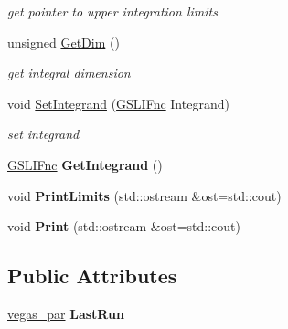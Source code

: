 \begin{DoxyCompactItemize}
\begin{DoxyCompactList}\small\item\em get pointer to upper integration limits \end{DoxyCompactList}\item 
\hypertarget{classIntegral_a6ed296293c2b08c0236481e865f853b7}{}unsigned \hyperlink{classIntegral_a6ed296293c2b08c0236481e865f853b7}{Get\+Dim} ()\label{classIntegral_a6ed296293c2b08c0236481e865f853b7}

\begin{DoxyCompactList}\small\item\em get integral dimension \end{DoxyCompactList}\item 
\hypertarget{classIntegral_ad1732ff730fedb0318db082f664aa195}{}void \hyperlink{classIntegral_ad1732ff730fedb0318db082f664aa195}{Set\+Integrand} (\hyperlink{Integrator_8h_a5a37a44de4bd56d47abffb5be0efb308}{G\+S\+L\+I\+Fnc} Integrand)\label{classIntegral_ad1732ff730fedb0318db082f664aa195}

\begin{DoxyCompactList}\small\item\em set integrand \end{DoxyCompactList}\item 
\hypertarget{classIntegral_a434ffd1525d0110a9e0d472721f51a32}{}\hyperlink{Integrator_8h_a5a37a44de4bd56d47abffb5be0efb308}{G\+S\+L\+I\+Fnc} {\bfseries Get\+Integrand} ()\label{classIntegral_a434ffd1525d0110a9e0d472721f51a32}

\item 
\hypertarget{classIntegral_a318a1ac7c8715d403046764afc47e66c}{}void {\bfseries Print\+Limits} (std\+::ostream \&ost=std\+::cout)\label{classIntegral_a318a1ac7c8715d403046764afc47e66c}

\item 
\hypertarget{classIntegral_ac16a7e08428f7b1879638a9a2981aea6}{}void {\bfseries Print} (std\+::ostream \&ost=std\+::cout)\label{classIntegral_ac16a7e08428f7b1879638a9a2981aea6}

\end{DoxyCompactItemize}
\subsection*{Public Attributes}
\begin{DoxyCompactItemize}
\item 
\hypertarget{classIntegral_a9d7c0d25642cec0937e5fae17b58b5bc}{}\hyperlink{classvegas__par}{vegas\+\_\+par} {\bfseries Last\+Run}\label{classIntegral_a9d7c0d25642cec0937e5fae17b58b5bc}

\end{DoxyCompactItemize}


